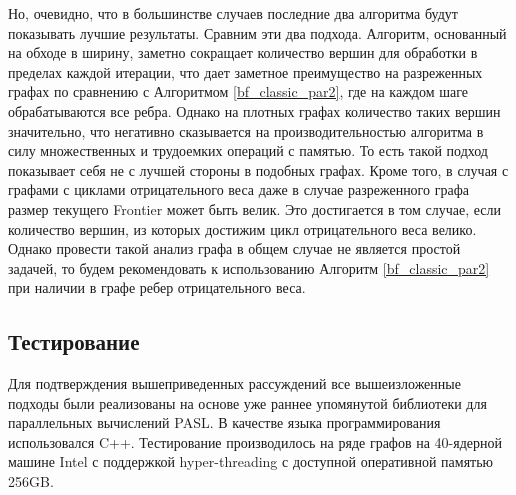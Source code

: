 Но, очевидно, что в большинстве случаев последние два алгоритма будут показывать лучшие результаты. Сравним эти два подхода. Алгоритм, основанный на обходе в ширину, заметно сокращает количество вершин для обработки в пределах каждой итерации, что дает заметное преимущество на разреженных графах по сравнению с Алгоритмом \ref{bf_classic_par2}, где на каждом шаге обрабатываются все ребра. Однако на плотных графах количество таких вершин значительно, что негативно сказывается на производительностью алгоритма в силу множественных и трудоемких операций с памятью. То есть такой подход показывает себя не с лучшей стороны в подобных графах. Кроме того, в случая с графами с циклами отрицательного веса даже в случае разреженного графа размер текущего Frontier может быть велик. Это достигается в том случае, если количество вершин, из которых достижим цикл отрицательного веса велико. Однако провести такой анализ графа в общем случае не является простой задачей, то будем рекомендовать к использованию Алгоритм \ref{bf_classic_par2} при наличии в графе ребер отрицательного веса.

\FloatBarrier
\subsection{Тестирование}

Для подтверждения вышеприведенных рассуждений все вышеизложенные подходы были реализованы на основе уже раннее упомянутой библиотеки для параллельных вычислений PASL. В качестве языка программирования использовался C++. Тестирование производилось на ряде графов на 40-ядерной машине Intel с поддержкой hyper-threading \cite{HYPERTHREADING} с доступной оперативной памятью 256GB. 

